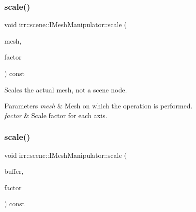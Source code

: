 \subsubsection{\texorpdfstring{scale()}{scale()}\hspace{0.1cm}{\footnotesize\ttfamily [2/4]}}
{\footnotesize\ttfamily void irr\+::scene\+::\+I\+Mesh\+Manipulator\+::scale (\begin{DoxyParamCaption}\item[{\hyperlink{classirr_1_1scene_1_1IMesh}{I\+Mesh} $\ast$}]{mesh,  }\item[{const \hyperlink{namespaceirr_1_1core_ae6e2b2a6c552833ebbd5b7463d03586b}{core\+::vector3df} \&}]{factor }\end{DoxyParamCaption}) const\hspace{0.3cm}{\ttfamily [inline]}}



Scales the actual mesh, not a scene node. 


\begin{DoxyParams}{Parameters}
{\em mesh} & Mesh on which the operation is performed. \\
\hline
{\em factor} & Scale factor for each axis. \\
\hline
\end{DoxyParams}
\mbox{\label{classirr_1_1scene_1_1IMeshManipulator_a6aa8b1bd153c7e524e8200988078282f}} 
\subsubsection{\texorpdfstring{scale()}{scale()}\hspace{0.1cm}{\footnotesize\ttfamily [3/4]}}
{\footnotesize\ttfamily void irr\+::scene\+::\+I\+Mesh\+Manipulator\+::scale (\begin{DoxyParamCaption}\item[{\hyperlink{classirr_1_1scene_1_1IMeshBuffer}{I\+Mesh\+Buffer} $\ast$}]{buffer,  }\item[{const \hyperlink{namespaceirr_1_1core_ae6e2b2a6c552833ebbd5b7463d03586b}{core\+::vector3df} \&}]{factor }\end{DoxyParamCaption}) const\hspace{0.3cm}{\ttfamily [inline]}}



